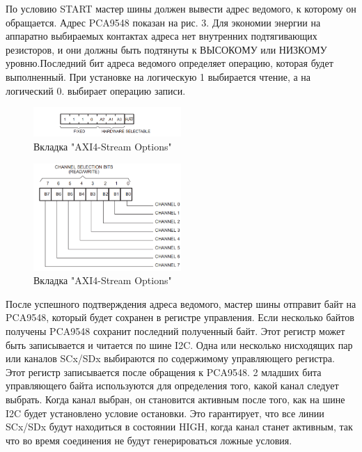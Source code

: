 \documentclass[a4paper,oneside ,10pt]{extreport}
\begin{document}
По условию START мастер шины должен вывести адрес ведомого, к которому он обращается. Адрес PCA9548 показан на рис. 3. Для экономии энергии на аппаратно выбираемых контактах адреса нет внутренних подтягивающих резисторов, и они должны быть подтянуты к ВЫСОКОМУ или НИЗКОМУ уровню.Последний бит адреса ведомого определяет операцию, которая будет выполненный. При установке на логическую 1 выбирается чтение, а на логический 0.
выбирает операцию записи.

\begin{figure}[h]
	\centering
	\includegraphics[width=0.5\textwidth]{image/PCA9548_addr.png}
	\caption{Вкладка "AXI4-Stream Options"}
	\label{PCA9548_addr.PNG}
\end{figure}

\begin{figure}[h]
	\centering
	\includegraphics[width=0.5\textwidth]{image/PCA9548_CR.png}
	\caption{Вкладка "AXI4-Stream Options"}
	\label{PCA9548_CR.PNG}
\end{figure}

После успешного подтверждения адреса ведомого,
мастер шины отправит байт на PCA9548, который будет сохранен
в регистре управления. Если несколько байтов получены
PCA9548 сохранит последний полученный байт. Этот регистр может быть
записывается и читается по шине I2C.
Одна или несколько нисходящих пар или каналов SCx/SDx выбираются по содержимому управляющего регистра. Этот регистр записывается после обращения к PCA9548. 2 младших бита управляющего байта используются для определения того, какой канал следует выбрать. Когда канал выбран, он становится активным после того, как на шине I2C будет установлено условие остановки. Это гарантирует, что все линии SCx/SDx будут находиться в состоянии HIGH, когда канал станет активным, так что во время соединения не будут генерироваться ложные условия.
\end{document}
